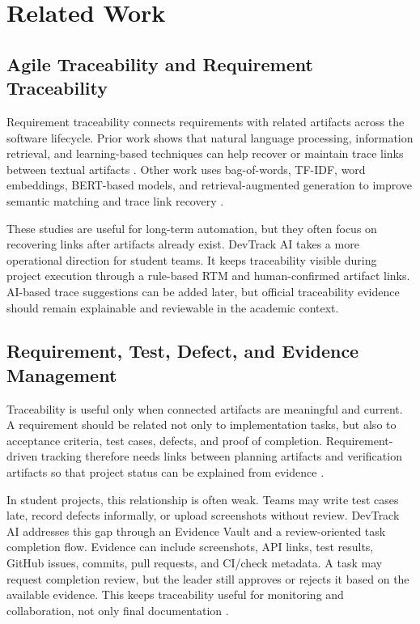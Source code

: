 \documentclass[runningheads]{llncs}
\begin{document}
\section{Related Work}

\subsection{Agile Traceability and Requirement Traceability}

Requirement traceability connects requirements with related artifacts across the
software lifecycle. Prior work shows that natural language processing, information
retrieval, and learning-based techniques can help recover or maintain trace links
between textual artifacts \cite{nlpTraceability,crossLevelTraceability}. Other work
uses bag-of-words, TF-IDF, word embeddings, BERT-based models, and retrieval-augmented
generation to improve semantic matching and trace link recovery
\cite{crossLevelTraceability,traceBert,ragTraceability}.

These studies are useful for long-term automation, but they often focus on recovering
links after artifacts already exist. DevTrack AI takes a more operational direction
for student teams. It keeps traceability visible during project execution through a
rule-based RTM and human-confirmed artifact links. AI-based trace suggestions can be
added later, but official traceability evidence should remain explainable and
reviewable in the academic context.

\subsection{Requirement, Test, Defect, and Evidence Management}

Traceability is useful only when connected artifacts are meaningful and current. A
requirement should be related not only to implementation tasks, but also to acceptance
criteria, test cases, defects, and proof of completion. Requirement-driven tracking
therefore needs links between planning artifacts and verification artifacts so that
project status can be explained from evidence \cite{nlpTraceability,crossLevelTraceability}.

In student projects, this relationship is often weak. Teams may write test cases
late, record defects informally, or upload screenshots without review. DevTrack AI
addresses this gap through an Evidence Vault and a review-oriented task completion
flow. Evidence can include screenshots, API links, test results, GitHub issues,
commits, pull requests, and CI/check metadata. A task may request completion review,
but the leader still approves or rejects it based on the available evidence. This
keeps traceability useful for monitoring and collaboration, not only final
documentation \cite{ragTraceability}.
\end{document}

